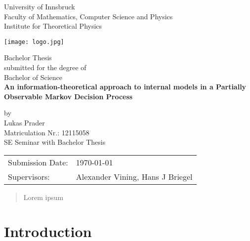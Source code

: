 \documentclass[12pt,a4paper]{article}
\begin{document}
\def\findate{\today}


\thispagestyle{empty}
\begin{center}
    \Large{University of Innsbruck \\ Faculty of Mathematics, Computer Science and Physics} \\
    \vspace{3mm}
    \large{Institute for Theoretical Physics}
    \vspace{10mm}

    \texttt{[image: logo.jpg]}

    \vspace{10mm}
    \Large{Bachelor Thesis} \\
    \large{submitted for the degree of} \\
    \Large{Bachelor of Science} \\
    \vspace{10mm}
    \LARGE{\textbf{An information-theoretical approach to internal models in a Partially Observable Markov Decision Process}} \\
    \vspace{10mm}

    \large{by \\ Lukas Prader \\ Matriculation Nr.: 12115058 \\ SE Seminar with Bachelor Thesis}
\end{center}

\vspace{30mm}
\begin{tabular}{ll}
    \large{Submission Date:} & \large{\findate}                          \\
    \large{Supervisors:}     & \large{Alexander Vining, Hans J  Briegel} \\
\end{tabular}


\newpage
\thispagestyle{empty}
\begin{abstract}
    Lorem ipsum
\end{abstract}


\newpage
\tableofcontents
\thispagestyle{empty}
\newpage
{}

\section{Introduction} \label{chap:introduction}
\end{document}
